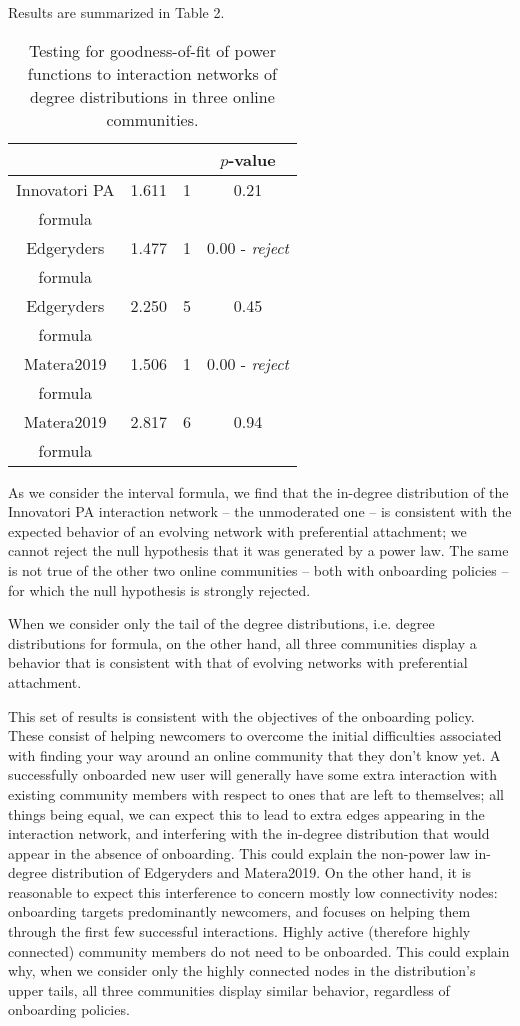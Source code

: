 Results are summarized in Table 2. 

\begin{table}[b]
\centering 
\begin{tabular}{| c | c | c | c |} 
\hline 
&  &  & $p$-value\\ 
\hline 
Innovatori PA & 1.611 & 1 & 0.21 \\
formula & & & \\
\hline
Edgeryders & 1.477 & 1 & 0.00 - \emph{reject} \\
formula & & & \\
\hline
Edgeryders & 2.250 & 5 & 0.45 \\
formula & & & \\
\hline
Matera2019 & 1.506 & 1 & 0.00 - \emph{reject} \\
formula & & & \\
\hline
Matera2019 & 2.817 & 6 & 0.94 \\
formula & & & \\
\hline 
\end{tabular}
\caption{Testing for goodness-of-fit of power functions to interaction networks of degree distributions in three online communities.}
\label{tab:goodnessoffit}
\end{table}

As we consider the interval formula, we find that the in-degree distribution of the Innovatori PA interaction network – the unmoderated one – is consistent with the expected behavior of an evolving network with preferential attachment; we cannot reject the null hypothesis that it was generated by a power law. The same is not true of the other two online communities – both with onboarding policies – for which the null hypothesis is strongly rejected.  

When we consider only the tail of the degree distributions, i.e. degree distributions for formula, on the other hand, all three communities display a behavior that is consistent with that of evolving networks with preferential attachment.

This set of results is consistent with the objectives of the onboarding policy. These consist of helping newcomers to overcome the initial difficulties associated with finding your way around an online community that they don't know yet. A successfully onboarded new user will generally have some extra interaction with existing community members with respect to ones that are left to themselves; all things being equal, we can expect this to lead to extra edges appearing in the interaction network, and interfering with the in-degree distribution that would appear in the absence of onboarding. This could explain the non-power law in-degree distribution of Edgeryders and Matera2019. On the other hand, it is reasonable to expect this interference to concern mostly low connectivity nodes: onboarding targets predominantly newcomers, and focuses on helping them through the first few successful interactions. Highly active (therefore highly connected) community members do not need to be onboarded. This could explain why, when we consider only the highly connected nodes in the distribution's upper tails, all three communities display similar behavior, regardless of onboarding policies. 

